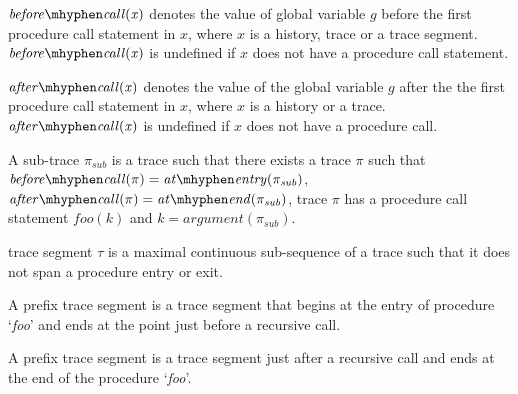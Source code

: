 \documentclass{llncs}
\newcommand{\foo}{\textit{foo}}
\newcommand{\trace}{\pi}
\newcommand{\gstate}{\gamma}
\newcommand{\g}{\textit{g}}
\newcommand{\atEntry}[1]{\mathit{at \mhyphen entry(#1)}}
\newcommand{\beforeCall}[1]{\mathit{before \mhyphen call(#1)}}
\newcommand{\atEnd}[1]{\mathit{at \mhyphen end(#1)}}
\newcommand{\tSegment}{\tau}
\newcommand{\param}[1]{\mathit{argument(#1)}}
\newcommand{\subTrace}{\pi_{sub}}
\newcommand{\afterCall}[1]{\mathit{after \mhyphen call(#1)}}
\begin{document}
\begin{definition}
  $\beforeCall{x}$ denotes the value of global variable $\g$ before
  the first procedure call statement in $x$, where $x$ is a history,
  trace or a trace segment. $\beforeCall{x}$ is undefined if $x$ does
  not have a procedure call statement.
\end{definition}

\begin{definition}
  $\afterCall{x}$ denotes the value of the global variable $\g$ after
  the the first procedure call statement in $x$, where $x$ is a
  history or a trace. $\afterCall{x}$ is undefined if $x$ does not
  have a procedure call.
\end{definition}

\begin{definition}
  A sub-trace $\subTrace$ is a trace such that there exists a trace
  $\trace$ such that $\beforeCall{\trace} = \atEntry{\subTrace}$,
  $\afterCall{\trace} = \atEnd{\subTrace}$, trace $\trace$ has a
  procedure call statement $\foo(k)$ and $k = \param{\subTrace}$.
\end{definition}

\begin{definition}
   trace segment $\tSegment$ is a maximal continuous sub-sequence of a
   trace such that it does not span a procedure entry or exit.
\end{definition}

\begin{definition}
  A prefix trace segment is a trace segment that begins at the entry
  of procedure `\foo' and ends at the point just before a recursive
  call.
\end{definition}

\begin{definition}
  A prefix trace segment is a trace segment just after a recursive
  call and ends at the end of the procedure `\foo'.
\end{definition}
\end{document}
